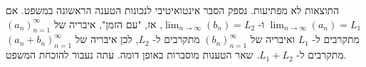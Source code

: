 \documentclass{article}
\begin{document}
התוצאות לא מפתיעות. נספק הסבר אינטואיטיבי לנכונות הטענה הראשונה במשפט. 
אם 
$\displaystyle\lim_{n \to \infty}(a_n)=L_1$ 
ו- 
$\displaystyle\lim_{n \to \infty}(b_n)=L_2$, 
אז, 
"עם הזמן",
איבריה של 
$(a_n)_{n=1}^\infty$ 
מתקרבים ל- 
$L_1$ 
ואיבריה של 
$(b_n)_{n=1}^\infty$ 
מתקרבים ל- 
$L_2$, 
לכן איבריה של 
$(a_n+b_n)_{n=1}^\infty$ 
מתקרבים ל- 
$L_1+L_2$. 
שאר הטענות מוסברות באופן דומה. עתה נעבור להוכחת המשפט. 
\end{document}
